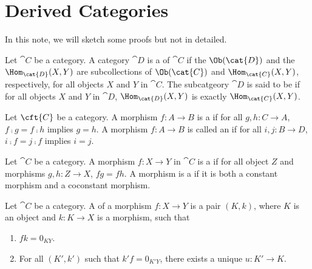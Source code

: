 \pagebreak
\section{Derived Categories}
\par
In this note, we will sketch some proofs but not in detailed.
\begin{definition}
    Let $\cat{C}$ be a category. A category $\cat{D}$ is a  of $\cat{C}$ if the $\Ob(\cat{D})$ and the ${\Hom}_{\cat{D}}(X,Y)$ are subcollections of $\Ob(\cat{C})$ and ${\Hom}_{\cat{C}}(X,Y)$, respectively, for all objects $X$ and $Y$ in $\cat{C}$. The subcatgeory $\cat{D}$ is said to be  if for all objects $X$ and $Y$ in $\cat{D}$, ${\Hom}_{\cat{D}}(X,Y)$ is exactly ${\Hom}_{\cat{C}}(X,Y)$.
\end{definition}
\begin{definition}
    Let $\cft{C}$ be a category. A morphism $f:A\to B$ is a  if for all $g,h:C\to A$, $f\comp g=f\comp h$ implies $g=h$. A morphism $f:A\to B$ is called an  if for all $i,j:B\to D$, $i\comp f=j\comp f$ implies $i=j$.
\end{definition}
\begin{definition}
    Let $\cat{C}$ be a category. A morphism $f:X\to Y$ in $\cat{C}$ is a  if for all object $Z$ and morphisms $g,h:Z\to X$, $fg=fh$. A morphism is a  if it is both a constant morphism and a coconstant morphism.
\end{definition}
\begin{definition}
    Let $\cat{C}$ be a category. A  of a morphism $f:X\to Y$ is a pair $(K,k)$, where $K$ is an object and $k:K\to X$ is a morphism, such that 
    \begin{enumerate}
        \item $fk={0}_{KY}$.
        \item For all $(K',k')$ such that $k'f={0}_{K'Y}$, there exists a unique $u:K'\to K$.
    \end{enumerate}
    \begin{center}
    \end{center}
\end{definition}
